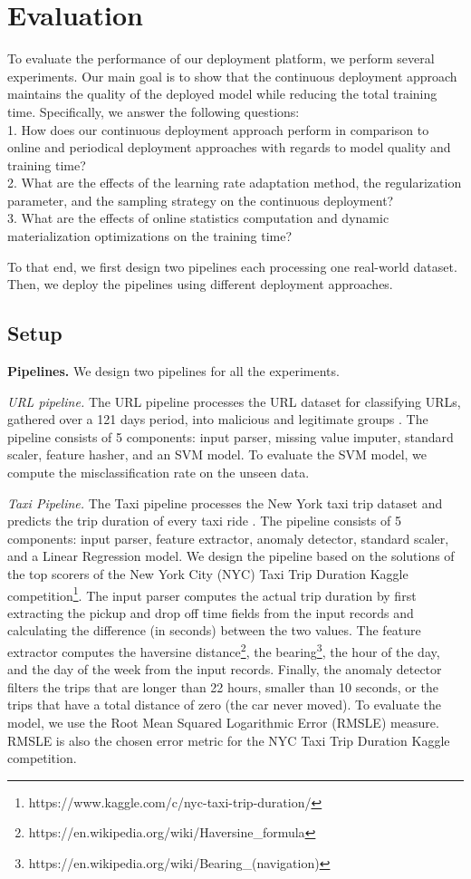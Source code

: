 \section{Evaluation} \label{evaluation} 
To evaluate the performance of our deployment platform, we perform several experiments.
Our main goal is to show that the continuous deployment approach maintains the quality of the deployed model while reducing the total training time.
Specifically, we answer the following questions:\\
1. How does our continuous deployment approach perform in comparison to online and periodical deployment approaches with regards to model quality and training time? \\
2. What are the effects of the learning rate adaptation method, the regularization parameter, and the sampling strategy on the continuous deployment? \\
3. What are the effects of online statistics computation and dynamic materialization optimizations on the training time?

To that end, we first design two pipelines each processing one real-world dataset.
Then, we deploy the pipelines using different deployment approaches.
\subsection{Setup}\label{subsec:setup}
\textbf{Pipelines.}
We design two pipelines for all the experiments.

\textit{URL pipeline.} The URL pipeline processes the URL dataset for classifying URLs, gathered over a 121 days period, into malicious and legitimate groups \cite{ma2009identifying}.
The pipeline consists of 5 components: input parser, missing value imputer, standard scaler, feature hasher, and an SVM model.
To evaluate the SVM model, we compute the misclassification rate on the unseen data.

\textit{Taxi Pipeline.} The Taxi pipeline processes the New York taxi trip dataset and predicts the trip duration of every taxi ride \cite{newyork-taxi}. 
The pipeline consists of 5 components: input parser, feature extractor, anomaly detector, standard scaler, and a Linear Regression model.
We design the pipeline based on the solutions of the top scorers of the New York City (NYC) Taxi Trip Duration Kaggle competition\footnote{https://www.kaggle.com/c/nyc-taxi-trip-duration/}. 
The input parser computes the actual trip duration by first extracting the pickup and drop off time fields from the input records and calculating the difference (in seconds) between the two values.
The feature extractor computes the haversine distance\footnote{https://en.wikipedia.org/wiki/Haversine\_formula}, the bearing\footnote{https://en.wikipedia.org/wiki/Bearing\_(navigation)}, the hour of the day, and the day of the week from the input records. 
Finally, the anomaly detector filters the trips that are longer than 22 hours, smaller than 10 seconds, or the trips that have a total distance of zero (the car never moved).
To evaluate the model, we use the Root Mean Squared Logarithmic Error (RMSLE) measure.
RMSLE is also the chosen error metric for the NYC Taxi Trip Duration Kaggle competition.

